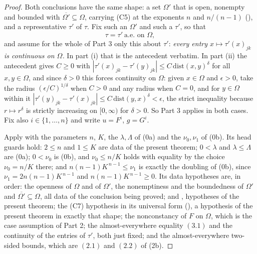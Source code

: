 \begin{proof}
Both conclusions have the same shape: a set $\Omega'$ that is open, nonempty and
bounded with $\overline{\Omega'}\subseteq\Omega$, carrying (C5) at the exponents
$n$ and $n/(n-1)$ (), and a representative
$\tau'$ of $\tau$.  Fix such an $\Omega'$ and such a $\tau'$, so that
\[
\tau=\tau'\ \text{a.e.\ on }\Omega,
\tag{3.1}
\]
and assume for the whole of Part 3 only this about $\tau'$: \emph{every entry
$x\mapsto\tau'(x)_{jk}$ is continuous on $\Omega$.}  In part (i) that is the
antecedent verbatim.  In part (ii) the antecedent gives $C\ge0$ with
$|\tau'(x)_{jk}-\tau'(y)_{jk}|\le C\,\mathrm{dist}(x,y)^\delta$ for all
$x,y\in\Omega$, and since $\delta>0$ this forces continuity on $\Omega$: given
$x\in\Omega$ and $\epsilon>0$, take the radius $(\epsilon/C)^{1/\delta}$ when
$C>0$ and any radius when $C=0$, and for $y\in\Omega$ within it
$|\tau'(y)_{jk}-\tau'(x)_{jk}|\le C\,\mathrm{dist}(y,x)^\delta<\epsilon$, the
strict inequality because $r\mapsto r^{\delta}$ is strictly increasing on
$[0,\infty)$ for $\delta>0$.  So Part 3 applies in both cases.  Fix also
$i\in\{1,\dots,n\}$ and write $u=F^i$, $g=G^i$.

Apply  with the parameters $n$, $K$,
the $\lambda,\Lambda$ of (0a) and the $\nu_0,\nu_1$ of (0b).  Its head guards
hold: $2\le n$ and $1\le K$ are data of the present theorem; $0<\lambda$ and
$\lambda\le\Lambda$ are (0a); $0<\nu_0$ is (0b), and $\nu_0\le n/K$ holds with
equality by the choice $\nu_0=n/K$ there; and $n(n-1)K^{\,n-1}\le\nu_1$ is
exactly the doubling of (0b), since $\nu_1=2n(n-1)K^{\,n-1}$ and
$n(n-1)K^{\,n-1}\ge0$.  Its data hypotheses are, in order: the openness of
$\Omega$ and of $\Omega'$, the nonemptiness and the boundedness of $\Omega'$ and
$\overline{\Omega'}\subseteq\Omega$, all data of the conclusion being proved;
 and , hypotheses of the
present theorem; the (C7) hypothesis in its universal form
(), a hypothesis of the present theorem in
exactly that shape; the nonconstancy of $F$ on $\Omega$, which is the case
assumption of Part 2; the almost-everywhere equality $(3.1)$ and the continuity
of the entries of $\tau'$, both just fixed; and the almost-everywhere two-sided
bounds, which are $(2.1)$ and $(2.2)$ of (2b).


\end{proof}
